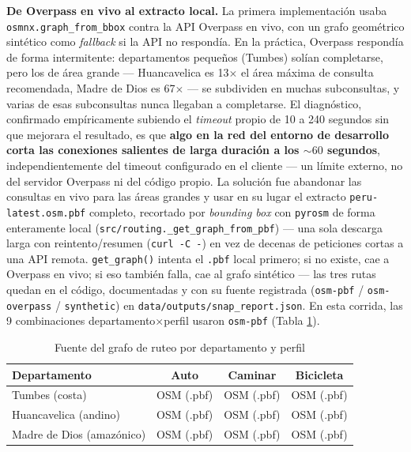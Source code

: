 \documentclass[11pt]{article}
\begin{document}
\textbf{De Overpass en vivo al extracto local.} La primera implementación
usaba \texttt{osmnx.graph\_from\_bbox} contra la API Overpass en vivo, con
un grafo geométrico sintético como \emph{fallback} si la API no respondía.
En la práctica, Overpass respondía de forma intermitente: departamentos
pequeños (Tumbes) solían completarse, pero los de área grande ---
Huancavelica es 13$\times$ el área máxima de consulta recomendada, Madre de
Dios es 67$\times$ --- se subdividen en muchas subconsultas, y varias de
esas subconsultas nunca llegaban a completarse. El diagnóstico, confirmado
empíricamente subiendo el \emph{timeout} propio de 10 a 240 segundos sin
que mejorara el resultado, es que \textbf{algo en la red del entorno de
desarrollo corta las conexiones salientes de larga duración a los
${\sim}60$ segundos}, independientemente del timeout configurado en el
cliente --- un límite externo, no del servidor Overpass ni del código
propio. La solución fue abandonar las consultas en vivo para las áreas
grandes y usar en su lugar el extracto \texttt{peru-latest.osm.pbf}
completo, recortado por \emph{bounding box} con \texttt{pyrosm} de forma
enteramente local (\texttt{src/routing.\_get\_graph\_from\_pbf}) --- una
sola descarga larga con reintento/resumen (\texttt{curl -C -}) en vez de
decenas de peticiones cortas a una API remota. \texttt{get\_graph()}
intenta el \texttt{.pbf} local primero; si no existe, cae a Overpass en
vivo; si eso también falla, cae al grafo sintético --- las tres rutas
quedan en el código, documentadas y con su fuente registrada
(\texttt{osm-pbf} / \texttt{osm-overpass} / \texttt{synthetic}) en
\texttt{data/outputs/snap\_report.json}. En esta corrida, las 9
combinaciones departamento$\times$perfil usaron \texttt{osm-pbf}
(Tabla \ref{tab:graph_sources}).

\begin{table}[h]
\centering
\caption{Fuente del grafo de ruteo por departamento y perfil}
\label{tab:graph_sources}
\begin{tabular}{lccc}
\toprule
Departamento & Auto & Caminar & Bicicleta \\
\midrule
Tumbes (costa) & OSM (.pbf) & OSM (.pbf) & OSM (.pbf) \\
Huancavelica (andino) & OSM (.pbf) & OSM (.pbf) & OSM (.pbf) \\
Madre de Dios (amazónico) & OSM (.pbf) & OSM (.pbf) & OSM (.pbf) \\
\bottomrule
\end{tabular}
\end{table}
\end{document}
